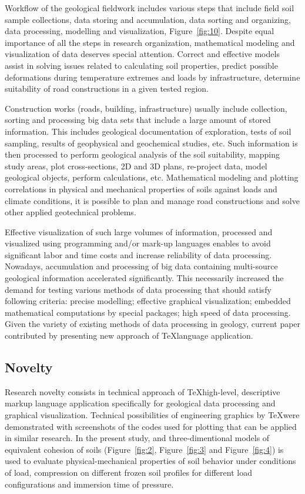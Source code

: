 \documentclass[a4paper,10pt]{article}
\begin{document}
Workflow of the geological fieldwork includes various steps that include field soil sample collections, data storing and accumulation, data sorting and organizing, data processing, modelling and visualization, Figure~\ref{fig:10}. Despite equal importance of all the steps in research organization, mathematical modeling and visualization of data deserves special attention. Correct and effective models assist in solving issues related to calculating soil properties, predict possible deformations during temperature extremes and loads by infrastructure, determine suitability of road constructions in a given tested region. 

Construction works (roads, building, infrastructure) usually include collection, sorting and processing big data sets that include a large amount of stored information. This includes geological documentation of exploration, tests of soil sampling, results of geophysical and geochemical studies, etc. Such information is then processed to perform geological analysis of the soil suitability, mapping study areas, plot cross-sections, 2D and 3D plans, re-project data, model geological objects, perform calculations, etc. Mathematical modeling and plotting correlations in physical and mechanical properties of soils against loads and climate conditions, it is possible to plan and manage road constructions and solve other applied geotechnical problems.

Effective visualization of such large volumes of information, processed and visualized using programming and/or mark-up languages enables to avoid significant labor and time costs and increase reliability of data processing. Nowadays, accumulation and processing of big data containing multi-source geological information accelerated significantly. This necessarily increased the demand for testing various methods of data processing that should satisfy following criteria: precise modelling; effective graphical visualization; embedded mathematical computations by special packages; high speed of data processing. Given the variety of existing methods of data processing in geology, current paper contributed by presenting new approach of \TeX \space language application. 

\subsection{Novelty}
Research novelty consists in technical approach of \TeX \space high-level, descriptive markup language application specifically for geological data processing and graphical visualization. Technical possibilities of engineering graphics by \TeX \space were demonstrated with screenshots of the codes used for plotting that can be applied in similar research. In the present study, and three-dimentional models of equivalent cohesion of soils (Figure~\ref{fig:2}, Figure~\ref{fig:3} and Figure~\ref{fig:4}) is used to evaluate physical-mechanical properties of soil behavior under conditions of load, compression on different frozen soil profiles for different load configurations and immersion time of pressure. 
\end{document}
